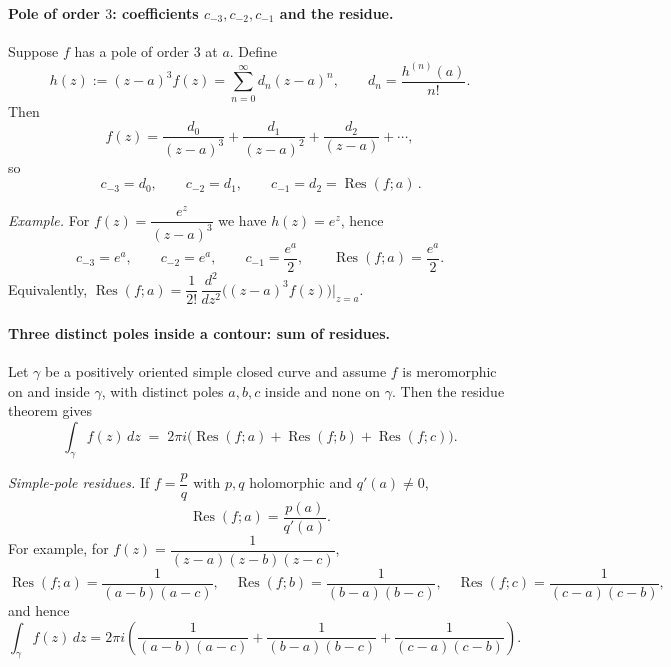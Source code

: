 \documentclass[11pt,a4paper]{article}
\theoremstyle{definition}
\theoremstyle{definition}
\theoremstyle{plain}
\theoremstyle{remark}
\DeclareMathOperator{\Res}{Res}
\begin{document}
\paragraph{Pole of order $3$: coefficients $c_{-3},c_{-2},c_{-1}$ and the residue.}
Suppose $f$ has a pole of order $3$ at $a$. Define
\[
h(z):=(z-a)^3 f(z)=\sum_{n=0}^{\infty} d_n (z-a)^n, \qquad d_n=\frac{h^{(n)}(a)}{n!}.
\]
Then
\[
f(z)=\frac{d_0}{(z-a)^3}+\frac{d_1}{(z-a)^2}+\frac{d_2}{(z-a)}+\cdots,
\]
so
\[
\boxed{\,c_{-3}=d_0,\qquad c_{-2}=d_1,\qquad c_{-1}=d_2=\Res(f;a)\,}.
\]

\emph{Example.} For $f(z)=\dfrac{e^{z}}{(z-a)^3}$ we have $h(z)=e^{z}$, hence
\[
c_{-3}=e^{a},\qquad c_{-2}=e^{a},\qquad c_{-1}=\frac{e^{a}}{2},\qquad \Res(f;a)=\frac{e^{a}}{2}.
\]
Equivalently, $\Res(f;a)=\dfrac{1}{2!}\,\dfrac{d^2}{dz^2}\big((z-a)^3 f(z)\big)\big|_{z=a}$.

\medskip
\paragraph{Three distinct poles inside a contour: sum of residues.}
Let $\gamma$ be a positively oriented simple closed curve and assume $f$ is meromorphic on and inside $\gamma$,
with distinct poles $a,b,c$ inside and none on $\gamma$. Then the residue theorem gives
\[
\boxed{\ \int_{\gamma} f(z)\,dz \;=\; 2\pi i\big(\Res(f;a)+\Res(f;b)+\Res(f;c)\big). \ }
\]

\emph{Simple-pole residues.}
If $f=\dfrac{p}{q}$ with $p,q$ holomorphic and $q'(a)\neq 0$,
\[
\Res(f;a)=\frac{p(a)}{q'(a)}.
\]
For example, for $f(z)=\dfrac{1}{(z-a)(z-b)(z-c)}$,
\[
\Res(f;a)=\frac{1}{(a-b)(a-c)},\quad
\Res(f;b)=\frac{1}{(b-a)(b-c)},\quad
\Res(f;c)=\frac{1}{(c-a)(c-b)},
\]
and hence
\[
\int_{\gamma} f(z)\,dz
= 2\pi i\!\left(\frac{1}{(a-b)(a-c)}+\frac{1}{(b-a)(b-c)}+\frac{1}{(c-a)(c-b)}\right).
\]


	
\end{document}
